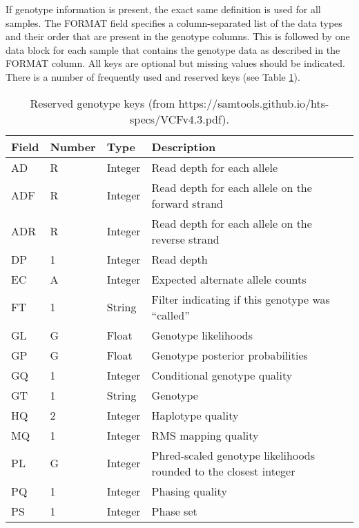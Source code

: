 If genotype information is present, the exact same definition is used for all samples. The FORMAT field specifies a column-separated list of the data types and their order that are present in the genotype columns. This is followed by one data block for each sample that contains the genotype data as described in the FORMAT column. All keys are optional but missing values should be indicated. There is a number of frequently used and reserved keys (see Table \ref{tab:reserved-genotypes}).

\begin{table}[H]
    \centering
      \begin{tabularx}{\textwidth}{ | p{2.5cm} | p{1.5cm} | p{1.5cm} | X | }
        \toprule
        Field		& Number	& Type		& Description \\ 
        \midrule
        AD		& R		& Integer	& Read depth for each allele \\
        ADF		& R		& Integer	& Read depth for each allele on the forward strand \\
        ADR		& R		& Integer	& Read depth for each allele on the reverse strand \\
        DP		& 1		& Integer	& Read depth \\
        EC		& A		& Integer	& Expected alternate allele counts \\
        FT		& 1		& String	& Filter indicating if this genotype was ``called'' \\
        GL		& G		& Float		& Genotype likelihoods \\
        GP		& G		& Float		& Genotype posterior probabilities \\
        GQ		& 1		& Integer	& Conditional genotype quality \\
        GT		& 1		& String	& Genotype \\
        HQ		& 2		& Integer	& Haplotype quality \\
        MQ		& 1		& Integer	& RMS mapping quality \\
        PL		& G		& Integer	& Phred-scaled genotype likelihoods rounded to the closest integer \\
        PQ		& 1		& Integer	& Phasing quality \\
        PS		& 1		& Integer	& Phase set \\
        \bottomrule
    \end{tabularx}
    \caption{Reserved genotype keys (from https://samtools.github.io/hts-specs/VCFv4.3.pdf).}
    \label{tab:reserved-genotypes}
  \end{table}

